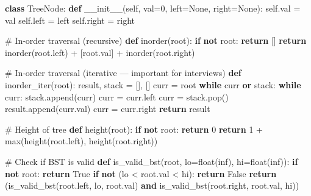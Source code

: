 \documentclass[11pt]{article}
\newenvironment{Shaded}{\begin{snugshade}}{\end{snugshade}}
\newcommand{\BuiltInTok}[1]{\textcolor[rgb]{0.50,0.55,0.55}{#1}}
\newcommand{\CommentTok}[1]{\textcolor[rgb]{0.48,0.49,0.49}{#1}}
\newcommand{\ControlFlowTok}[1]{\textcolor[rgb]{0.99,0.74,0.29}{\textbf{#1}}}
\newcommand{\DecValTok}[1]{\textcolor[rgb]{0.96,0.45,0.00}{#1}}
\newcommand{\FunctionTok}[1]{\textcolor[rgb]{0.56,0.27,0.68}{#1}}
\newcommand{\KeywordTok}[1]{\textcolor[rgb]{0.81,0.81,0.76}{\textbf{#1}}}
\newcommand{\NormalTok}[1]{\textcolor[rgb]{0.81,0.81,0.76}{#1}}
\newcommand{\OperatorTok}[1]{\textcolor[rgb]{0.81,0.81,0.76}{#1}}
\newcommand{\StringTok}[1]{\textcolor[rgb]{0.96,0.31,0.31}{#1}}
\newcommand{\VariableTok}[1]{\textcolor[rgb]{0.15,0.68,0.68}{#1}}
\begin{document}
\begin{Shaded}
\begin{Highlighting}[]
\KeywordTok{class}\NormalTok{ TreeNode:}
    \KeywordTok{def} \FunctionTok{\_\_init\_\_}\NormalTok{(}\VariableTok{self}\NormalTok{, val}\OperatorTok{=}\DecValTok{0}\NormalTok{, left}\OperatorTok{=}\VariableTok{None}\NormalTok{, right}\OperatorTok{=}\VariableTok{None}\NormalTok{):}
        \VariableTok{self}\NormalTok{.val }\OperatorTok{=}\NormalTok{ val}
        \VariableTok{self}\NormalTok{.left }\OperatorTok{=}\NormalTok{ left}
        \VariableTok{self}\NormalTok{.right }\OperatorTok{=}\NormalTok{ right}

\CommentTok{\# In{-}order traversal (recursive)}
\KeywordTok{def}\NormalTok{ inorder(root):}
    \ControlFlowTok{if} \KeywordTok{not}\NormalTok{ root: }\ControlFlowTok{return}\NormalTok{ []}
    \ControlFlowTok{return}\NormalTok{ inorder(root.left) }\OperatorTok{+}\NormalTok{ [root.val] }\OperatorTok{+}\NormalTok{ inorder(root.right)}

\CommentTok{\# In{-}order traversal (iterative — important for interviews)}
\KeywordTok{def}\NormalTok{ inorder\_iter(root):}
\NormalTok{    result, stack }\OperatorTok{=}\NormalTok{ [], []}
\NormalTok{    curr }\OperatorTok{=}\NormalTok{ root}
    \ControlFlowTok{while}\NormalTok{ curr }\KeywordTok{or}\NormalTok{ stack:}
        \ControlFlowTok{while}\NormalTok{ curr:}
\NormalTok{            stack.append(curr)}
\NormalTok{            curr }\OperatorTok{=}\NormalTok{ curr.left}
\NormalTok{        curr }\OperatorTok{=}\NormalTok{ stack.pop()}
\NormalTok{        result.append(curr.val)}
\NormalTok{        curr }\OperatorTok{=}\NormalTok{ curr.right}
    \ControlFlowTok{return}\NormalTok{ result}

\CommentTok{\# Height of tree}
\KeywordTok{def}\NormalTok{ height(root):}
    \ControlFlowTok{if} \KeywordTok{not}\NormalTok{ root: }\ControlFlowTok{return} \DecValTok{0}
    \ControlFlowTok{return} \DecValTok{1} \OperatorTok{+} \BuiltInTok{max}\NormalTok{(height(root.left), height(root.right))}

\CommentTok{\# Check if BST is valid}
\KeywordTok{def}\NormalTok{ is\_valid\_bst(root, lo}\OperatorTok{=}\BuiltInTok{float}\NormalTok{(}\StringTok{\textquotesingle{}{-}inf\textquotesingle{}}\NormalTok{), hi}\OperatorTok{=}\BuiltInTok{float}\NormalTok{(}\StringTok{\textquotesingle{}inf\textquotesingle{}}\NormalTok{)):}
    \ControlFlowTok{if} \KeywordTok{not}\NormalTok{ root: }\ControlFlowTok{return} \VariableTok{True}
    \ControlFlowTok{if} \KeywordTok{not}\NormalTok{ (lo }\OperatorTok{\textless{}}\NormalTok{ root.val }\OperatorTok{\textless{}}\NormalTok{ hi): }\ControlFlowTok{return} \VariableTok{False}
    \ControlFlowTok{return}\NormalTok{ (is\_valid\_bst(root.left, lo, root.val) }\KeywordTok{and}
\NormalTok{            is\_valid\_bst(root.right, root.val, hi))}


\end{Highlighting}
\end{Shaded}
\end{document}
